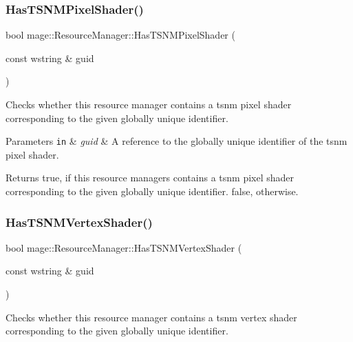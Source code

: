 \subsubsection{\texorpdfstring{Has\+T\+S\+N\+M\+Pixel\+Shader()}{HasTSNMPixelShader()}}
{\footnotesize\ttfamily bool mage\+::\+Resource\+Manager\+::\+Has\+T\+S\+N\+M\+Pixel\+Shader (\begin{DoxyParamCaption}\item[{const wstring \&}]{guid }\end{DoxyParamCaption})\hspace{0.3cm}{\ttfamily [noexcept]}}

Checks whether this resource manager contains a tsnm pixel shader corresponding to the given globally unique identifier.


\begin{DoxyParams}[1]{Parameters}
\mbox{\tt in}  & {\em guid} & A reference to the globally unique identifier of the tsnm pixel shader. \\
\hline
\end{DoxyParams}
\begin{DoxyReturn}{Returns}
{\ttfamily true}, if this resource managers contains a tsnm pixel shader corresponding to the given globally unique identifier. {\ttfamily false}, otherwise. 
\end{DoxyReturn}
\hypertarget{classmage_1_1_resource_manager_aaed0648fcca9ef8c5ea901adf8691eb2}{}\label{classmage_1_1_resource_manager_aaed0648fcca9ef8c5ea901adf8691eb2} 
\subsubsection{\texorpdfstring{Has\+T\+S\+N\+M\+Vertex\+Shader()}{HasTSNMVertexShader()}}
{\footnotesize\ttfamily bool mage\+::\+Resource\+Manager\+::\+Has\+T\+S\+N\+M\+Vertex\+Shader (\begin{DoxyParamCaption}\item[{const wstring \&}]{guid }\end{DoxyParamCaption})\hspace{0.3cm}{\ttfamily [noexcept]}}

Checks whether this resource manager contains a tsnm vertex shader corresponding to the given globally unique identifier.


